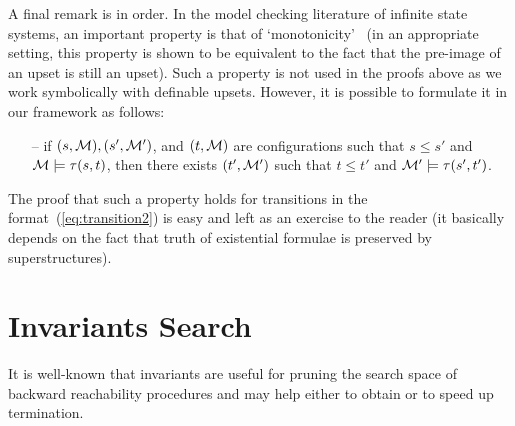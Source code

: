 \documentclass{LMCS}
\newcommand{\cM}{\ensuremath \mathcal M}
\theoremstyle{plain}\newtheorem{assumption}[thm]{Assumption}
\theoremstyle{plain}\newtheorem{proposition}[thm]{Proposition}
\theoremstyle{plain}\newtheorem{property}[thm]{Property}
\theoremstyle{plain}\newtheorem{example}[thm]{Example}
\theoremstyle{plain}\newtheorem{claim}[thm]{Claim}
\theoremstyle{plain}\newtheorem{lemma}[thm]{Lemma}
\begin{document}
\noindent A final remark is in order.  In the model checking literature of
infinite state systems, an important property is that of
`monotonicity'~\cite{lics}
(in an appropriate setting, this property is shown to be equivalent to
the fact that the pre-image of an upset is still an upset).  Such a
property is not used in the proofs above as we work symbolically with
definable upsets.  However, it is possible to formulate it in our
framework as follows:
\begin{itemize}
\item[--] if $(s, \cM), (s', \cM')$, and $(t, \cM)$ are configurations
  such that $s\leq s'$ and $\cM\models \tau(s,t)$, then there exists
  $(t',\cM')$ such that $t\leq t'$ and $\cM'\models \tau(s', t')$.
\end{itemize}
The proof that such a property holds for transitions in the
format~(\ref{eq:transition2}) is easy and left as an exercise to the
reader (it basically depends on the fact that truth of existential
formulae is preserved by superstructures).



\section{Invariants Search}
\label{sec:inv}

It is well-known that invariants are useful for pruning the search
space of backward reachability procedures and may help either to
obtain or to speed up termination.
\end{document}
